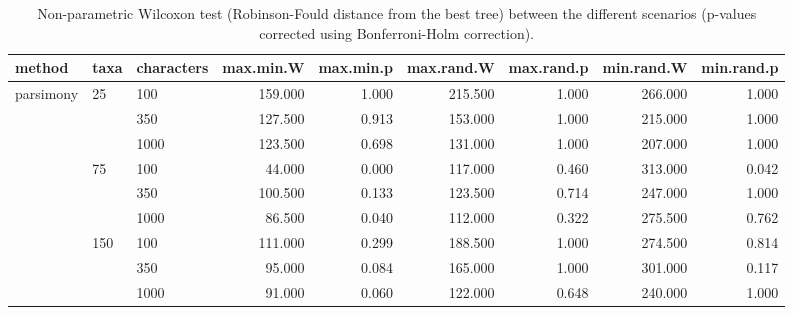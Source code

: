 \begin{table}[ht]
\centering
\begin{tabular}{lllrrrrrr}
  \hline
method & taxa & characters & max.min.W & max.min.p & max.rand.W & max.rand.p & min.rand.W & min.rand.p \\ 
  \hline
parsimony & 25 & 100 & 159.000 & 1.000 & 215.500 & 1.000 & 266.000 & 1.000 \\ 
   &  & 350 & 127.500 & 0.913 & 153.000 & 1.000 & 215.000 & 1.000 \\ 
   &  & 1000 & 123.500 & 0.698 & 131.000 & 1.000 & 207.000 & 1.000 \\ 
   & 75 & 100 & 44.000 & 0.000 & 117.000 & 0.460 & 313.000 & 0.042 \\ 
   &  & 350 & 100.500 & 0.133 & 123.500 & 0.714 & 247.000 & 1.000 \\ 
   &  & 1000 & 86.500 & 0.040 & 112.000 & 0.322 & 275.500 & 0.762 \\ 
   & 150 & 100 & 111.000 & 0.299 & 188.500 & 1.000 & 274.500 & 0.814 \\ 
   &  & 350 & 95.000 & 0.084 & 165.000 & 1.000 & 301.000 & 0.117 \\ 
   &  & 1000 & 91.000 & 0.060 & 122.000 & 0.648 & 240.000 & 1.000 \\ 
   \hline
\end{tabular}
\caption{Non-parametric Wilcoxon test (Robinson-Fould distance from the best tree) between the different scenarios (p-values corrected using Bonferroni-Holm correction).} 
\label{Full_Tab_Parsimony_WXRFbest}
\end{table}
